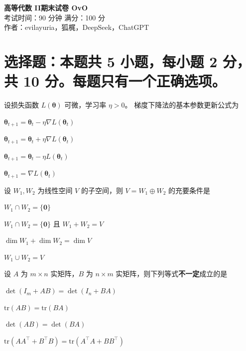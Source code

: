 \documentclass[11pt,a4paper]{exam-zh}
\newcommand{\bvec}[1]{\boldsymbol{#1}}
\newcommand{\tr}{\mathrm{tr}}
\begin{document}
\begin{center}
{\LARGE \textbf{高等代数 II\quad 期末试卷 OvO}}\\[1em]
{\large 考试时间：90 分钟 \quad 满分：100 分\\作者：evilayuria，狐梶，DeepSeek，ChatGPT}\\[0.5em]
\end{center}

\section{选择题：本题共 5 小题，每小题 2 分，共 10 分。每题只有一个正确选项。}

\begin{question}
  设损失函数 $L\left(\bvec{\theta}\right)$ 可微，学习率 $\eta>0$。
  梯度下降法的基本参数更新公式为
  \begin{choices}
    \item $\bvec{\theta}_{t+1}
      = \bvec{\theta}_t-\eta\nabla L\left(\bvec{\theta}_t\right)$
    \item $\bvec{\theta}_{t+1}
      = \bvec{\theta}_t+\eta\nabla L\left(\bvec{\theta}_t\right)$
    \item $\bvec{\theta}_{t+1}
      = \bvec{\theta}_t-\eta L\left(\bvec{\theta}_t\right)$
    \item $\bvec{\theta}_{t+1}
      = \nabla L\left(\bvec{\theta}_t\right)$
  \end{choices}
\end{question}

\begin{question}
  设 $W_1, W_2$ 为线性空间 $V$ 的子空间，则 $V = W_1 \oplus W_2$ 的充要条件是
  \begin{choices}
    \item $W_1 \cap W_2 = \{\bvec{0}\}$
    \item $W_1 \cap W_2 = \{\bvec{0}\}$ 且 $W_1 + W_2 = V$
    \item $\dim W_1 + \dim W_2 = \dim V$
    \item $W_1 \cup W_2 = V$
  \end{choices}
\end{question}

\begin{question}
  设 $A$ 为 $m \times n$ 实矩阵，$B$ 为 $n \times m$ 实矩阵，则下列等式\textbf{不一定}成立的是
  \begin{choices}
    \item $\det\left(I_m + AB\right) = \det\left(I_n + BA\right)$
    \item $\tr\left(AB\right) = \tr\left(BA\right)$
    \item $\det\left(AB\right) = \det\left(BA\right)$
    \item $\tr\left(AA^\top+B^\top B\right)=\tr\left(A^\top A+BB^\top \right)$
  \end{choices}
\end{question}
\end{document}
